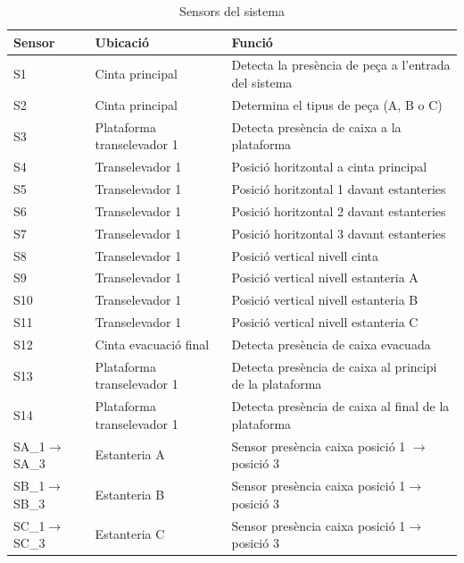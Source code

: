 \documentclass[a4paper,11pt,DIV=13,headings=normal,abstract=true,twoside=semi]{article}
\begin{document}
\begin{table}[H]
\centering
\small

\caption{Sensors del sistema}
\label{tab:tab_sensors}
\begin{tabular}{|p{3cm}|p{5cm}|p{6cm}|}

\hline
\textbf{Sensor} & \textbf{Ubicació} & \textbf{Funció} \\ \hline

S1 & Cinta principal & Detecta la presència de peça a l'entrada del sistema \\ \hline
S2 & Cinta principal & Determina el tipus de peça (A, B o C) \\ \hline
S3 & Plataforma transelevador 1 & Detecta presència de caixa a la plataforma \\ \hline
S4 & Transelevador 1 & Posició horitzontal a cinta principal \\ \hline
S5 & Transelevador 1 & Posició horitzontal 1 davant estanteries \\ \hline
S6 & Transelevador 1 & Posició horitzontal 2 davant estanteries \\ \hline
S7 & Transelevador 1 & Posició horitzontal 3 davant estanteries \\ \hline
S8 & Transelevador 1 & Posició vertical nivell cinta \\ \hline
S9 & Transelevador 1 & Posició vertical nivell estanteria A \\ \hline
S10 & Transelevador 1 & Posició vertical nivell estanteria B \\ \hline
S11 & Transelevador 1 & Posició vertical nivell estanteria C \\ \hline
S12 & Cinta evacuació final & Detecta presència de caixa evacuada \\ \hline
S13 & Plataforma transelevador 1 & Detecta presència de caixa al principi de la plataforma \\ \hline
S14 & Plataforma transelevador 1 & Detecta presència de caixa  al final de la plataforma \\ \hline

SA\_1$\rightarrow$SA\_3 & Estanteria A & Sensor presència caixa posició 1 $\rightarrow$posició 3  \\ \hline
SB\_1$\rightarrow$SB\_3 & Estanteria B & Sensor presència caixa posició 1$\rightarrow$posició 3  \\ \hline
SC\_1$\rightarrow$SC\_3 & Estanteria C & Sensor presència caixa posició 1$\rightarrow$posició 3\\ \hline


\end{tabular}
\end{table}
\end{document}
